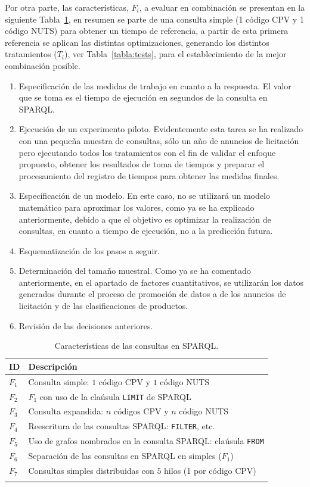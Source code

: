 \documentclass[a4paper,final,11pt,fleqn,twoside]{book}  %
\begin{document}
Por otra parte, las características, $F_i$, a evaluar en combinación se presentan en la siguiente Tabla~\ref{table:sparql-features}, en resumen se parte de una 
consulta simple (1 código CPV y 1 código NUTS) para obtener un tiempo de referencia, a partir de esta primera referencia se aplican 
las distintas optimizaciones, generando los distintos tratamientos ($T_i$), ver Tabla~\ref{tabla:tests}, para el establecimiento de la mejor combinación posible.
\begin{enumerate}
  \item Especificación de las medidas de trabajo en cuanto a la respuesta. El valor que se toma es el tiempo de ejecución 
en segundos de la consulta en SPARQL. 
 \item Ejecución de un experimento piloto. Evidentemente esta tarea se ha realizado con una pequeña muestra de consultas, sólo un año de anuncios 
de licitación pero ejecutando todos los tratamientos con el fin de validar el enfoque propuesto, obtener los resultados de toma de tiempos y preparar 
el procesamiento del registro de tiempos para obtener las medidas finales.
 \item Especificación de un modelo. En este caso, no se utilizará un modelo matemático para aproximar los valores, 
como ya se ha explicado anteriormente, debido a que el objetivo es optimizar la realización de consultas, en cuanto a 
tiempo de ejecución, no a la predicción futura.
 \item Esquematización de los pasos a seguir.
 \item Determinación del tamaño muestral. Como ya se ha comentado anteriormente, en el apartado de factores cuantitativos, se utilizarán los datos generados durante el proceso de promoción 
de datos a \linkeddata de los anuncios de licitación y de las clasificaciones de productos.
 \item Revisión de las decisiones anteriores.
\end{enumerate}

\newpage
\begin{longtable}[c]{|l|p{10cm}|} 
\hline
\textbf{ID} &  \textbf{Descripción}  \\\hline
\endhead
$F_1$ & Consulta simple: $1$ código CPV y $1$ código NUTS \\ \hline
$F_2$ & $F_1$ con uso de la claúsula \texttt{LIMIT} de SPARQL \\ \hline
$F_3$ & Consulta expandida: $n$ códigos CPV y $n$ código NUTS  \\ \hline
$F_4$ & Reescritura de las consultas SPARQL: \texttt{FILTER}, etc.  \\ \hline
$F_5$ & Uso de grafos nombrados en la consulta SPARQL: claúsula \texttt{FROM} \\ \hline
$F_6$ & Separación de las consultas en SPARQL en simples ($F_1$) \\ \hline
$F_7$ & Consultas simples distribuidas con $5$ hilos (1 por código CPV) \\ \hline
\hline
\caption{Características de las consultas en SPARQL.}\label{table:sparql-features}\\    
\end{longtable}
\end{document}
